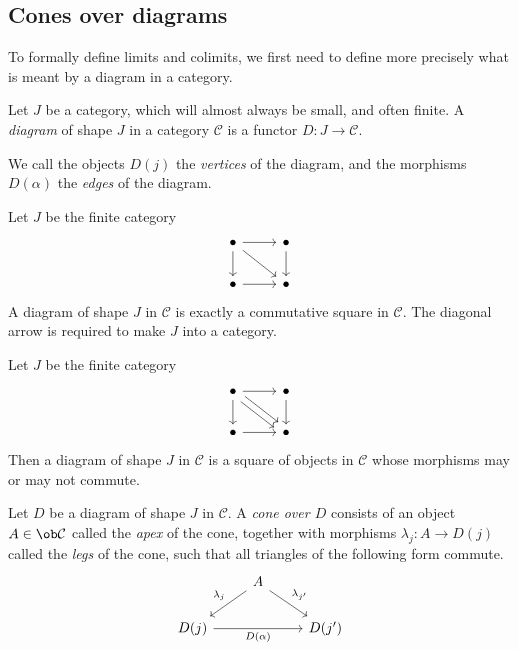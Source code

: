\subsection{Cones over diagrams}
To formally define limits and colimits, we first need to define more precisely what is meant by a diagram in a category.
\begin{definition}
    Let \( J \) be a category, which will almost always be small, and often finite.
    A \emph{diagram} of shape \( J \) in a category \( \mathcal C \) is a functor \( D : J \to \mathcal C \).
\end{definition}
We call the objects \( D(j) \) the \emph{vertices} of the diagram, and the morphisms \( D(\alpha) \) the \emph{edges} of the diagram.
\begin{example}
    Let \( J \) be the finite category
\[\begin{tikzcd}
	\bullet & \bullet \\
	\bullet & \bullet
	\arrow[from=1-1, to=1-2]
	\arrow[from=1-2, to=2-2]
	\arrow[from=1-1, to=2-2]
	\arrow[from=1-1, to=2-1]
	\arrow[from=2-1, to=2-2]
\end{tikzcd}\]
    A diagram of shape \( J \) in \( \mathcal C \) is exactly a commutative square in \( \mathcal C \).
    The diagonal arrow is required to make \( J \) into a category.
\end{example}
\begin{example}
    Let \( J \) be the finite category
\[\begin{tikzcd}
	\bullet & \bullet \\
	\bullet & \bullet
	\arrow[from=1-1, to=1-2]
	\arrow[from=1-2, to=2-2]
	\arrow[from=1-1, to=2-1]
	\arrow[from=2-1, to=2-2]
	\arrow[shift left=1, from=1-1, to=2-2]
	\arrow[shift right=1, from=1-1, to=2-2]
\end{tikzcd}\]
    Then a diagram of shape \( J \) in \( \mathcal C \) is a square of objects in \( \mathcal C \) whose morphisms may or may not commute.
\end{example}
\begin{definition}
    Let \( D \) be a diagram of shape \( J \) in \( \mathcal C \).
    A \emph{cone over \( D \)} consists of an object \( A \in \ob \mathcal C \) called the \emph{apex} of the cone, together with morphisms \( \lambda_j : A \to D(j) \) called the \emph{legs} of the cone, such that all triangles of the following form commute.
\[\begin{tikzcd}
	& A \\
	{D(j)} && {D(j')}
	\arrow["{\lambda_j}"', from=1-2, to=2-1]
	\arrow["{D(\alpha)}"', from=2-1, to=2-3]
	\arrow["{\lambda_{j'}}", from=1-2, to=2-3]
\end{tikzcd}\]
\end{definition}
